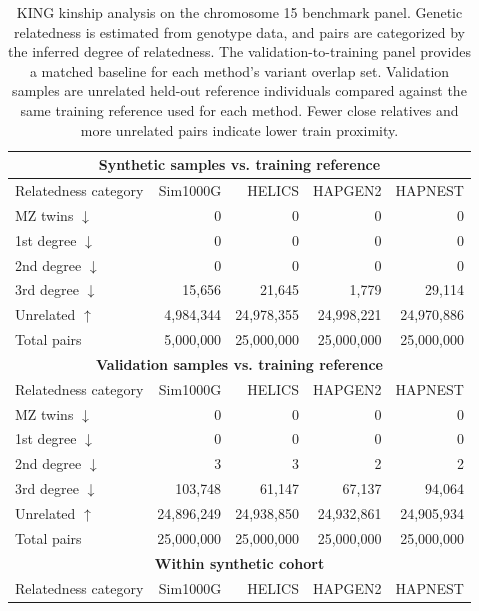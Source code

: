 \documentclass{article}
\begin{document}
\begin{table}[h]
\centering
\caption{
KING kinship analysis on the chromosome 15 benchmark panel. Genetic relatedness is estimated from genotype data, and pairs are categorized by the inferred degree of relatedness. The validation-to-training panel provides a matched baseline for each method's variant overlap set. Validation samples are unrelated held-out reference individuals compared against the same training reference used for each method. Fewer close relatives and more unrelated pairs indicate lower train proximity.
}
\label{tab:king_relatedness}
\begin{tabular}{lrrrr}
\toprule
\multicolumn{5}{c}{\textbf{Synthetic samples vs. training reference}} \\
\midrule
Relatedness category & Sim1000G & HELICS & HAPGEN2 & HAPNEST \\
\midrule
MZ twins \(\downarrow\)      & 0 & 0 & 0 & 0 \\
1st degree \(\downarrow\)    & 0 & 0 & 0 & 0 \\
2nd degree \(\downarrow\)    & 0 & 0 & 0 & 0 \\
3rd degree \(\downarrow\)    & 15{,}656 & 21{,}645 & 1{,}779 & 29{,}114 \\
Unrelated \(\uparrow\)       & 4{,}984{,}344 & 24{,}978{,}355 & 24{,}998{,}221 & 24{,}970{,}886 \\
Total pairs                  & 5{,}000{,}000 & 25{,}000{,}000 & 25{,}000{,}000 & 25{,}000{,}000 \\
\midrule
\multicolumn{5}{c}{\textbf{Validation samples vs. training reference}} \\
\midrule
Relatedness category & Sim1000G & HELICS & HAPGEN2 & HAPNEST \\
\midrule
MZ twins \(\downarrow\)      & 0 & 0 & 0 & 0 \\
1st degree \(\downarrow\)    & 0 & 0 & 0 & 0 \\
2nd degree \(\downarrow\)    & 3 & 3 & 2 & 2 \\
3rd degree \(\downarrow\)    & 103{,}748 & 61{,}147 & 67{,}137 & 94{,}064 \\
Unrelated \(\uparrow\)       & 24{,}896{,}249 & 24{,}938{,}850 & 24{,}932{,}861 & 24{,}905{,}934 \\
Total pairs                  & 25{,}000{,}000 & 25{,}000{,}000 & 25{,}000{,}000 & 25{,}000{,}000 \\
\midrule
\multicolumn{5}{c}{\textbf{Within synthetic cohort}} \\
\midrule
Relatedness category & Sim1000G & HELICS & HAPGEN2 & HAPNEST \\

\end{tabular}
\end{table}
\end{document}
